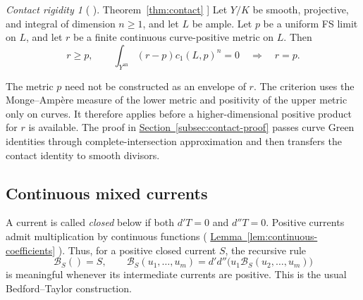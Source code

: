 \documentclass[11pt]{amsart}
\theoremstyle{definition}
\theoremstyle{remark}
\newtheorem*{contactintro}{Contact rigidity}
\numberwithin{equation}{section}
\newcommand{\ddc}{d'd''}
\newcommand{\an}{\mathrm{an}}
\newcommand{\namedref}[2]{%
 \begingroup
 \ifstrequal{#1}{Section}{\hypersetup{linkcolor=sectionteal}}{%
  \ifstrequal{#1}{Appendix}{\hypersetup{linkcolor=sectionteal}}{}}%
 \hyperref[#2]{#1~\ref*{#2}}%
 \endgroup}
\begin{document}
\begin{contactintro}[\namedref{Theorem}{thm:contact}]
Let \(Y/K\) be smooth, projective, and integral of dimension \(n\ge1\),
and let \(L\) be ample. Let \(p\) be a uniform FS limit on \(L\), and let
\(r\) be a finite continuous curve-positive metric on \(L\). Then
\begin{equation}\label{eq:contact-intro}
 r\ge p,\qquad \int_{Y^\an}(r-p)c_1(L,p)^n=0
 \quad\Longrightarrow\quad r=p.
\end{equation}
\end{contactintro}

The metric \(p\) need not be constructed as an envelope of \(r\).
The criterion uses the Monge--Amp\`ere measure of the lower metric and
positivity of the upper metric only on curves. It therefore applies
before a higher-dimensional positive product for \(r\) is available.
The proof in \namedref{Section}{subsec:contact-proof} passes curve Green
identities through complete-intersection approximation and then
transfers the contact identity to smooth divisors.

\subsection{Continuous mixed currents}
A current is called \emph{closed} below if both \(d'T=0\) and \(d''T=0\).
Positive currents admit multiplication by continuous functions
(\namedref{Lemma}{lem:continuous-coefficients}). Thus, for a positive closed
current \(S\), the recursive rule
\begin{equation}\label{eq:recursive-product}
 \mathcal B_S()=S,\qquad
 \mathcal B_S(u_1,\ldots,u_m)
 =\ddc\bigl(u_1\mathcal B_S(u_2,\ldots,u_m)\bigr)
\end{equation}
is meaningful whenever its intermediate currents are positive.
This is the usual Bedford--Taylor construction.
\end{document}
